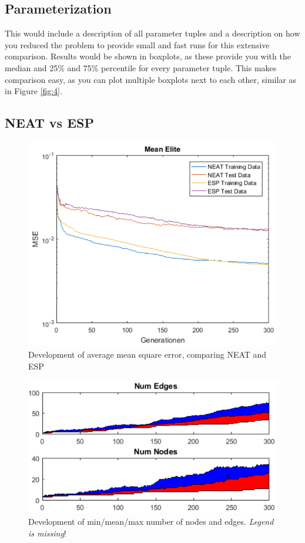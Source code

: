 \documentclass{hbrs-ecta-report}
\begin{document}
\subsection{Parameterization}
This would include a description of all parameter tuples and a description on how you reduced the problem to provide small and fast runs for this extensive comparison. Results would be shown in boxplots, as these provide you with the median and 25\% and 75\% percentile for every parameter tuple. This makes comparison easy, as you can plot multiple boxplots next to each other, similar as in Figure \ref{fig:4}.

\subsection{NEAT vs ESP}

\begin{figure}[ht!]
\centering
\includegraphics[width=\linewidth]{img/1.png}
\caption{Development of average mean square error, comparing NEAT and ESP}
\label{fig:1} 
\end{figure}
 
\begin{figure}[ht!]
\centering
\includegraphics[width=\linewidth]{img/2.png}
\caption{Development of min/mean/max number of nodes and edges. \textit{Legend is missing}!}
\label{fig:2} 
\end{figure}
\end{document}
